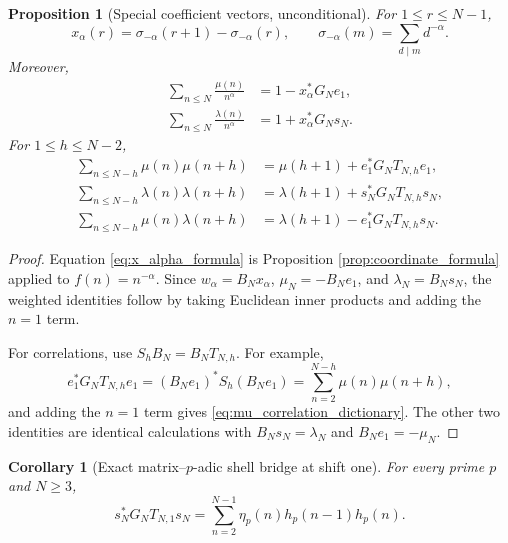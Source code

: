 \documentclass[11pt]{amsart}
\numberwithin{equation}{section}
\theoremstyle{plain}
\newtheorem{proposition}[theorem]{Proposition}
\newtheorem{corollary}[theorem]{Corollary}
\theoremstyle{definition}
\theoremstyle{remark}
\newcommand{\mob}{\mu}
\newcommand{\liou}{\lambda}
\begin{document}
\begin{proposition}[Special coefficient vectors, unconditional]
\label{prop:coefficient_dictionary}
For $1\le r\le N-1$,
\begin{equation}
x_\alpha(r)=\sigma_{-\alpha}(r+1)-\sigma_{-\alpha}(r),
\qquad
\sigma_{-\alpha}(m)=\sum_{d\mid m}d^{-\alpha}.
\label{eq:x_alpha_formula}
\end{equation}
Moreover,
\begin{align}
\sum_{n\le N}\frac{\mob(n)}{n^\alpha}
&=1-x_\alpha^*G_Ne_1,
\label{eq:mu_weighted_dictionary}\\
\sum_{n\le N}\frac{\liou(n)}{n^\alpha}
&=1+x_\alpha^*G_Ns_N.
\label{eq:lambda_weighted_dictionary}
\end{align}
For $1\le h\le N-2$,
\begin{align}
\sum_{n\le N-h}\mob(n)\mob(n+h)
&=\mob(h+1)+e_1^*G_NT_{N,h}e_1,
\label{eq:mu_correlation_dictionary}\\
\sum_{n\le N-h}\liou(n)\liou(n+h)
&=\liou(h+1)+s_N^*G_NT_{N,h}s_N,
\label{eq:lambda_correlation_dictionary}\\
\sum_{n\le N-h}\mob(n)\liou(n+h)
&=\liou(h+1)-e_1^*G_NT_{N,h}s_N.
\label{eq:mixed_correlation_dictionary}
\end{align}
\end{proposition}

\begin{proof}
Equation \eqref{eq:x_alpha_formula} is Proposition \ref{prop:coordinate_formula} applied to $f(n)=n^{-\alpha}$.  Since $w_\alpha=B_Nx_\alpha$, $\mob_N=-B_Ne_1$, and $\liou_N=B_Ns_N$, the weighted identities follow by taking Euclidean inner products and adding the $n=1$ term.

For correlations, use $S_hB_N=B_NT_{N,h}$.  For example,
\begin{equation}
e_1^*G_NT_{N,h}e_1
=(B_Ne_1)^*S_h(B_Ne_1)
=\sum_{n=2}^{N-h}\mob(n)\mob(n+h),
\label{eq:mu_correlation_proof}
\end{equation}
and adding the $n=1$ term gives \eqref{eq:mu_correlation_dictionary}.  The other two identities are identical calculations with $B_Ns_N=\liou_N$ and $B_Ne_1=-\mob_N$.
\end{proof}

\begin{corollary}[Exact matrix--$p$-adic shell bridge at shift one]
\label{cor:matrix_shell_bridge}
For every prime $p$ and $N\ge3$,
\begin{equation}
s_N^*G_NT_{N,1}s_N
=\sum_{n=2}^{N-1}\eta_p(n)h_p(n-1)h_p(n).
\label{eq:matrix_shell_bridge}
\end{equation}
\end{corollary}
\end{document}

